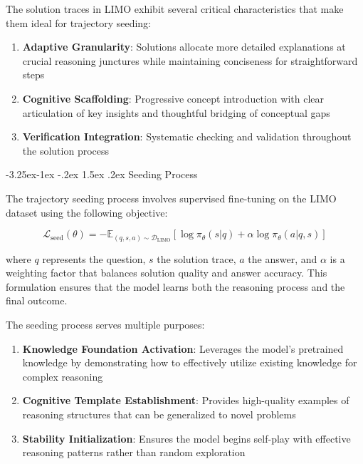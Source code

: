 \documentclass[10pt,a4paper]{article}
\makeatletter
\renewcommand\subsubsection{\@startsection{subsubsection}{3}{\z@}%
  {-3.25ex\@plus -1ex \@minus -.2ex}%
  {1.5ex \@plus .2ex}%
  {\fontfamily{sourcecodepro}\selectfont\normalsize\bfseries}}
\makeatother
\begin{document}
The solution traces in LIMO exhibit several critical characteristics that make them ideal for trajectory seeding:

\begin{enumerate}
\item \textbf{Adaptive Granularity}: Solutions allocate more detailed explanations at crucial reasoning junctures while maintaining conciseness for straightforward steps
\item \textbf{Cognitive Scaffolding}: Progressive concept introduction with clear articulation of key insights and thoughtful bridging of conceptual gaps
\item \textbf{Verification Integration}: Systematic checking and validation throughout the solution process
\end{enumerate}

\subsubsection{Seeding Process}

The trajectory seeding process involves supervised fine-tuning on the LIMO dataset using the following objective:

\begin{equation}
\mathcal{L}_{\text{seed}}(\theta) = -\mathbb{E}_{(q,s,a) \sim \mathcal{D}_{\text{LIMO}}} \left[ \log \pi_\theta(s|q) + \alpha \log \pi_\theta(a|q,s) \right]
\end{equation}

where $q$ represents the question, $s$ the solution trace, $a$ the answer, and $\alpha$ is a weighting factor that balances solution quality and answer accuracy. This formulation ensures that the model learns both the reasoning process and the final outcome.

The seeding process serves multiple purposes:

\begin{enumerate}
\item \textbf{Knowledge Foundation Activation}: Leverages the model's pretrained knowledge by demonstrating how to effectively utilize existing knowledge for complex reasoning
\item \textbf{Cognitive Template Establishment}: Provides high-quality examples of reasoning structures that can be generalized to novel problems
\item \textbf{Stability Initialization}: Ensures the model begins self-play with effective reasoning patterns rather than random exploration
\end{enumerate}
\end{document}
